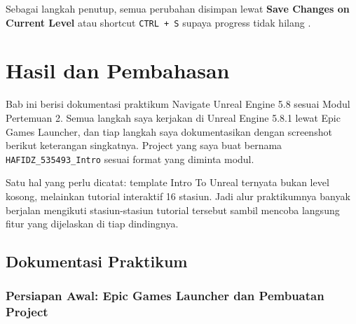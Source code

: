 \documentclass[a4paper,oneside,12pt]{report}
\newcommand{\tocboldsection}[1]{%
  \protect\renewcommand{\protect\cftchapfont}{\protect\bfseries}%
  #1%
  \protect\renewcommand{\protect\cftchapfont}{}%
}
\begin{document}
Sebagai langkah penutup, semua perubahan disimpan lewat \textbf{Save Changes on Current Level} atau shortcut \texttt{CTRL + S} supaya progress tidak hilang \cite{modul2}.

\clearpage

\chapter[\tocboldsection{Hasil dan Pembahasan}]{Hasil dan Pembahasan}

Bab ini berisi dokumentasi praktikum Navigate Unreal Engine 5.8 sesuai Modul Pertemuan 2. Semua langkah saya kerjakan di Unreal Engine 5.8.1 lewat Epic Games Launcher, dan tiap langkah saya dokumentasikan dengan screenshot berikut keterangan singkatnya. Project yang saya buat bernama \texttt{HAFIDZ\_535493\_Intro} sesuai format yang diminta modul.

Satu hal yang perlu dicatat: template Intro To Unreal ternyata bukan level kosong, melainkan tutorial interaktif 16 stasiun. Jadi alur praktikumnya banyak berjalan mengikuti stasiun-stasiun tutorial tersebut sambil mencoba langsung fitur yang dijelaskan di tiap dindingnya.

\section{Dokumentasi Praktikum}

\subsection{Persiapan Awal: Epic Games Launcher dan Pembuatan Project}
\end{document}
